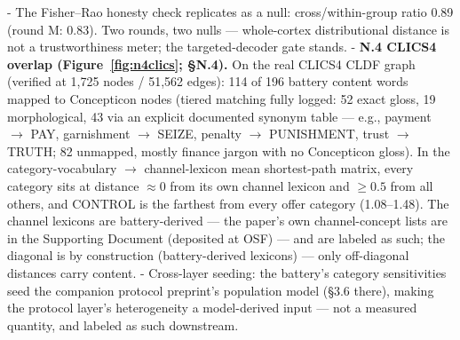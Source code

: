 \documentclass[11pt,twocolumn]{article}
\theoremstyle{plain}
\begin{document}
\begin{itemize}
- The Fisher–Rao honesty check replicates as a null: cross/within-group ratio 0.89 (round M: 0.83). Two rounds, two nulls — whole-cortex distributional distance is not a trustworthiness meter; the targeted-decoder gate stands.
- \textbf{N.4 CLICS4 overlap (Figure~\ref{fig:n4clics}; \S{}N.4).} On the real CLICS4 CLDF graph (verified at 1,725 nodes / 51,562 edges): 114 of 196 battery content words mapped to Concepticon nodes (tiered matching fully logged: 52 exact gloss, 19 morphological, 43 via an explicit documented synonym table --- e.g., payment $\to$ PAY, garnishment $\to$ SEIZE, penalty $\to$ PUNISHMENT, trust $\to$ TRUTH; 82 unmapped, mostly finance jargon with no Concepticon gloss). In the category-vocabulary $\to$ channel-lexicon mean shortest-path matrix, every category sits at distance $\approx 0$ from its own channel lexicon and $\geq 0.5$ from all others, and CONTROL is the farthest from every offer category (1.08--1.48). The channel lexicons are battery-derived --- the paper's own channel-concept lists are in the Supporting Document (deposited at OSF) --- and are labeled as such; the diagonal is by construction (battery-derived lexicons) --- only off-diagonal distances carry content.
- Cross-layer seeding: the battery's category sensitivities seed the companion protocol preprint's population model (\S{}3.6 there), making the protocol layer's heterogeneity a model-derived input — not a measured quantity, and labeled as such downstream.

\end{itemize}
\end{document}
